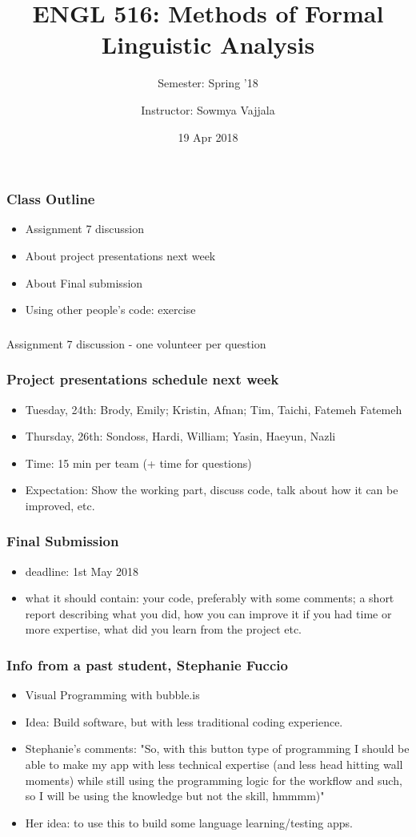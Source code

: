 \documentclass{beamer}
\author[Sowmya Vajjala]{Instructor: Sowmya Vajjala}
\title[ENGL 516]{ENGL 516: Methods of Formal Linguistic Analysis}
\subtitle{Semester: Spring '18}
\date{19 Apr 2018}
\institute{Iowa State University, USA}
\begin{document}
\begin{frame}\titlepage
\end{frame}

\begin{frame}
\frametitle{Class Outline}
\begin{itemize}
\item Assignment 7 discussion
\item About project presentations next week
\item About Final submission
\item Using other people's code: exercise
\end{itemize}
\end{frame}

\begin{frame}
\frametitle{}
Assignment 7 discussion
- one volunteer per question
\end{frame}

\begin{frame}
\frametitle{Project presentations schedule next week}
\begin{itemize}
\item Tuesday, 24th: Brody, Emily; Kristin, Afnan; Tim, Taichi, Fatemeh
Fatemeh
\item Thursday, 26th: Sondoss, Hardi, William; Yasin, Haeyun, Nazli
\item Time: 15 min per team (+ time for questions)
\item Expectation: Show the working part, discuss code, talk about how it can be improved, etc. 
\end{itemize}
\end{frame}

\begin{frame}
\frametitle{Final Submission}
\begin{itemize}
\item deadline: 1st May 2018
\item what it should contain: your code, preferably with some comments; a short report describing what you did, how you can improve it if you had time or more expertise, what did you learn from the project etc. 
\end{itemize}
\end{frame}

\begin{frame}
\frametitle{Info from a past student, Stephanie Fuccio}
\begin{itemize}
\item Visual Programming with bubble.is
\item Idea: Build software, but with less traditional coding experience.
\item Stephanie's comments: "So, with this button type of programming I should be able to make my app with less technical expertise (and less head hitting wall moments) while still using the programming logic for the workflow and such, so I will be using the knowledge but not the skill, hmmmm)"
\item Her idea: to use this to build some language learning/testing apps. 
\end{itemize}
\end{frame}
\end{document}
